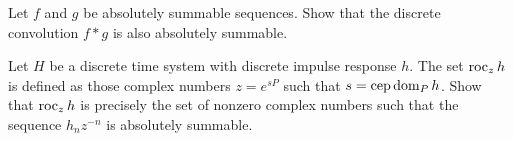 \begin{excersizelist}
\begin{hardexercise}

\item \label{exer:convabssummableisabssummable}  Let $f$ and $g$ be absolutely summable sequences.  Show that the discrete convolution $f * g$ is also absolutely summable.  


\item \label{exer:roczabssummrel} Let $H$ be a discrete time system with discrete impulse response $h$.  The set $\operatorname{roc}_z h$ is defined as those complex numbers $z = e^{sP}$ such that $s = \operatorname{cep} \operatorname{dom}_P h$.  Show that $\operatorname{roc}_z h$ is precisely the set of nonzero complex numbers such that the sequence $h_n z^{-n}$ is absolutely summable.



\end{hardexercise}
\end{excersizelist}
